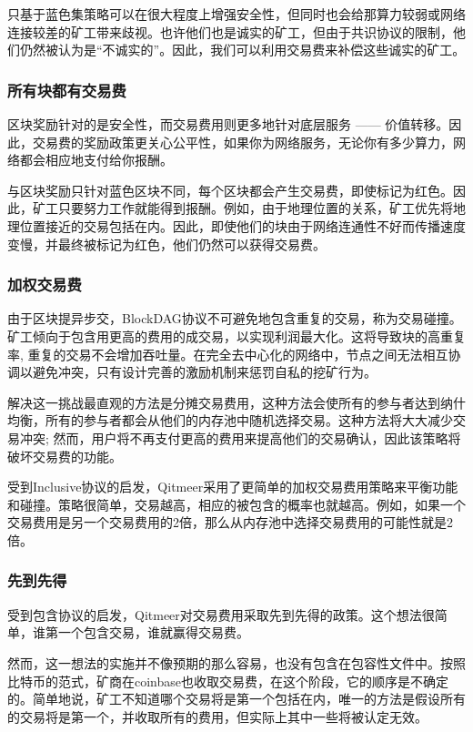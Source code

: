 \documentclass[a4paper,11pt]{article}
\begin{document}
只基于蓝色集策略可以在很大程度上增强安全性，但同时也会给那算力较弱或网络连接较差的矿工带来歧视。也许他们也是诚实的矿工，但由于共识协议的限制，他们仍然被认为是“不诚实的”。因此，我们可以利用交易费来补偿这些诚实的矿工。

\subsubsection{所有块都有交易费}
区块奖励针对的是安全性，而交易费用则更多地针对底层服务 —— 价值转移。因此，交易费的奖励政策更关心公平性，如果你为网络服务，无论你有多少算力，网络都会相应地支付给你报酬。


与区块奖励只针对蓝色区块不同，每个区块都会产生交易费，即使标记为红色。因此，矿工只要努力工作就能得到报酬。例如，由于地理位置的关系，矿工优先将地理位置接近的交易包括在内。因此，即使他们的块由于网络连通性不好而传播速度变慢，并最终被标记为红色，他们仍然可以获得交易费。

\subsubsection{加权交易费}

由于区块提异步交，BlockDAG协议不可避免地包含重复的交易，称为交易碰撞。矿工倾向于包含用更高的费用的成交易，以实现利润最大化。这将导致块的高重复率, 重复的交易不会增加吞吐量。在完全去中心化的网络中，节点之间无法相互协调以避免冲突，只有设计完善的激励机制来惩罚自私的挖矿行为。

解决这一挑战最直观的方法是分摊交易费用，这种方法会使所有的参与者达到纳什均衡，所有的参与者都会从他们的内存池中随机选择交易。这种方法将大大减少交易冲突; 然而，用户将不再支付更高的费用来提高他们的交易确认，因此该策略将破坏交易费的功能。


受到Inclusive协议的启发，Qitmeer采用了更简单的加权交易费用策略来平衡功能和碰撞。策略很简单，交易越高，相应的被包含的概率也就越高。例如，如果一个交易费用是另一个交易费用的2倍，那么从内存池中选择交易费用的可能性就是2倍。

\subsubsection{先到先得}

受到包含协议的启发，Qitmeer对交易费用采取先到先得的政策。这个想法很简单，谁第一个包含交易，谁就赢得交易费。


然而，这一想法的实施并不像预期的那么容易，也没有包含在包容性文件中。按照比特币的范式，矿商在coinbase也收取交易费，在这个阶段，它的顺序是不确定的。简单地说，矿工不知道哪个交易将是第一个包括在内，唯一的方法是假设所有的交易将是第一个，并收取所有的费用，但实际上其中一些将被认定无效。
\end{document}
